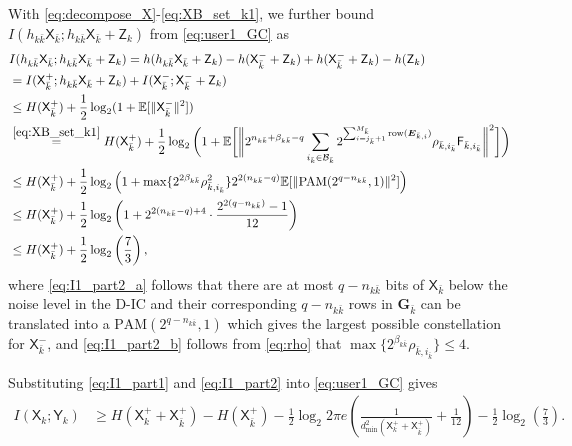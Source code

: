 \documentclass[12pt, draftclsnofoot, onecolumn]{IEEEtran}
\newcommand{\msf}[1]{\mathsf{#1}}
\newcommand{\E}{\mathbb{E}}
\theoremstyle{definition}
\begin{document}
With \eqref{eq:decompose_X}-\eqref{eq:XB_set_k1}, we further bound $I(h_{k\bar{k}}\msf{X}_{\bar{k}};h_{k{\bar{k}}}\msf{X}_{\bar{k}}+\msf{Z}_k)$ from \eqref{eq:user1_GC} as
\begin{subequations}\label{eq:I1_part2}
\begin{align}
&I(h_{k\bar{k}}\msf{X}_{\bar{k}};h_{k{\bar{k}}}\msf{X}_{\bar{k}}+\msf{Z}_k) = h(h_{k\bar{k}}\msf{X}_{\bar{k}}+\msf{Z}_k)-h(\msf{X}^{-}_{\bar{k}}+\msf{Z}_k) %
+h(\msf{X}^{-}_{\bar{k}}+\msf{Z}_k) - h(\msf{Z}_k) \nonumber\\
&=I(\msf{X}^{+}_{\bar{k}};h_{k\bar{k}}\msf{X}_{\bar{k}}+\msf{Z}_k)+I(\msf{X}^{-}_{\bar{k}};\msf{X}^{-}_{\bar{k}}+\msf{Z}_k) \nonumber\\
&\leq  H(\msf{X}^{+}_{\bar{k}})+\frac{1}{2}\log_2(1+\E[\|\msf{X}^{-}_{\bar{k}}\|^2]) \nonumber\\
&\overset{\eqref{eq:XB_set_k1}}{=}H(\msf{X}^{+}_{\bar{k}})+\frac{1}{2}\log_2\bigg(1+\E\bigg[\bigg\|2^{n_{k\bar{k}}+\beta_{k\bar{k}}-q}\sum_{i_{\bar{k}} \in \mathcal{B}_{\bar{k}}}2^{\sum_{i=j_{\bar{k}}+1}^{M_{\bar{k}}}\text{row}(\boldsymbol{E}_{{\bar{k}},i})}\rho_{\bar{k},i_{\bar{k}}}\msf{F}_{\bar{k},i_{\bar{k}}}\bigg\|^2\bigg]\bigg) \nonumber \\
&\leq H(\msf{X}^{+}_{\bar{k}})+\frac{1}{2}\log_2\left(1+\max\{2^{2\beta_{k\bar{k}}}\rho^2_{\bar{k},i_{\bar{k}}}\}2^{2(n_{k\bar{k}}-q)}\E[\|\text{PAM}(2^{q-n_{k\bar{k}}},1)\|^2]\right) \label{eq:I1_part2_a}\\
&\leq H(\msf{X}^{+}_{\bar{k}})+\frac{1}{2}\log_2\left(1+2^{2(n_{k\bar{k}}-q)+4}\cdot \frac{2^{2(q-n_{k\bar{k}})}-1}{12}\right)\label{eq:I1_part2_b} \\
&\leq H(\msf{X}^{+}_{\bar{k}})+\frac{1}{2}\log_2\left(\frac{7}{3}\right),
\end{align}
\end{subequations}
where \eqref{eq:I1_part2_a} follows that there are at most $q-n_{k\bar{k}}$ bits of $\msf{X}_{\bar{k}}$ below the noise level in the D-IC and their corresponding $q-n_{k\bar{k}}$ rows in $\boldsymbol{G}_{\bar{k}}$ can be translated into a $\text{PAM}(2^{q-n_{k\bar{k}}},1)$ which gives the largest possible constellation for $\msf{X}^{-}_{\bar{k}}$, and \eqref{eq:I1_part2_b} follows from \eqref{eq:rho} that $\max\{2^{\beta_{k\bar{k}}}\rho_{\bar{k},i_{\bar{k}}}\} \leq 4$.



Substituting \eqref{eq:I1_part1} and \eqref{eq:I1_part2} into \eqref{eq:user1_GC} gives
\begin{align}\label{eq:user1_rate}
I(\msf{X}_k;\msf{Y}_k) & \geq  H(\msf{X}^{+}_k+\msf{X}^{+}_{\bar{k}}) -  H(\msf{X}^{+}_{\bar{k}})-\frac{1}{2}\log_2 2\pi e \left(\frac{1}{ d^2_{\min}(\msf{X}^{+}_k+\msf{X}^{+}_{\bar{k}})} + \frac{1}{12}\right)-\frac{1}{2}\log_2\left(\frac{7}{3}\right).
\end{align}
\end{document}
